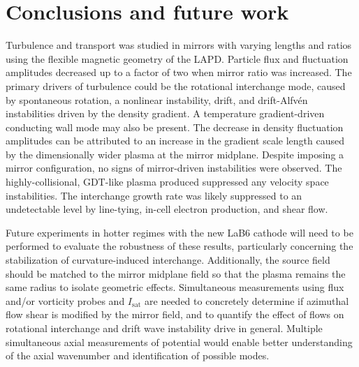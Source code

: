 \section{\label{sec:mirror-turb_conclusion}Conclusions and future work}

Turbulence and transport was studied in mirrors with varying lengths and ratios using the flexible magnetic geometry of the LAPD. Particle flux and fluctuation amplitudes decreased up to a factor of two when mirror ratio was increased. The primary drivers of turbulence could be the rotational interchange mode, caused by spontaneous rotation, a nonlinear instability, drift, and drift-Alfvén instabilities driven by the density gradient. A temperature gradient-driven conducting wall mode may also be present. The decrease in density fluctuation amplitudes can be attributed to an increase in the gradient scale length caused by the dimensionally wider plasma at the mirror midplane. Despite imposing a mirror configuration, no signs of mirror-driven instabilities were observed. The highly-collisional, GDT-like plasma produced suppressed any velocity space instabilities. The interchange growth rate was likely suppressed to an undetectable level by line-tying, in-cell electron production, and shear flow.

Future experiments in hotter regimes with the new LaB6 cathode \cite{LAPD_LaB6} will need to be performed to evaluate the robustness of these results, particularly concerning the stabilization of curvature-induced interchange. Additionally, the source field should be matched to the mirror midplane field so that the plasma remains the same radius to isolate geometric effects.
Simultaneous measurements using flux and/or vorticity probes and $I_\text{sat}$ are needed to concretely determine if azimuthal flow shear is modified by the mirror field, and to quantify the effect of flows on rotational interchange and drift wave instability drive in general.
Multiple simultaneous axial measurements of potential would enable better understanding of the axial wavenumber and identification of possible modes.

%
%


